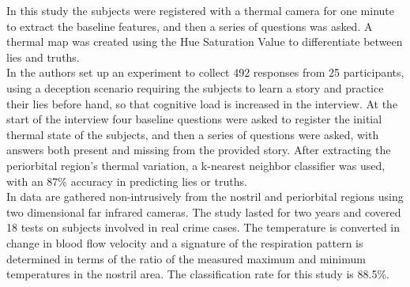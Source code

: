 In this study the subjects were registered with a thermal camera for one minute to extract the baseline features, and then a series of questions was asked. A thermal map was created using the Hue Saturation Value to differentiate between lies and truths.\\
In \cite{Rajoub} the authors set up an experiment to collect 492 responses from 25 participants, using a deception scenario requiring the subjects to learn a story and practice their lies before hand, so that cognitive load is increased in the interview. At the start of the interview four baseline questions were asked to register the initial thermal state of the subjects, and then a series of questions were asked, with answers both present and missing from the provided story. After extracting the periorbital region's thermal variation, a k-nearest neighbor classifier was used, with an 87\% accuracy in predicting lies or truths.  \\
In \cite{6967765} data are gathered non-intrusively from the nostril and periorbital regions using two dimensional far infrared cameras. The study lasted for two years and covered 18 tests on subjects involved in real crime cases. The temperature is converted in change in blood flow velocity and a signature of the respiration pattern is determined in terms of the ratio of the measured maximum and minimum temperatures in the nostril area. The classification rate for this study is 88.5\%.




